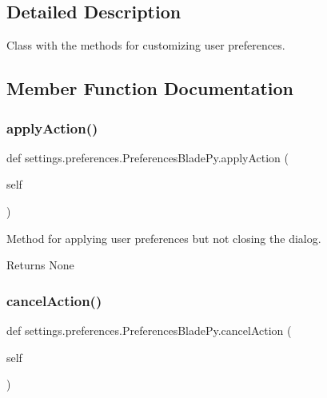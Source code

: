 \subsection{Detailed Description}
Class with the methods for customizing user preferences. 

\subsection{Member Function Documentation}
\hypertarget{a00109_a8938a7b43ca7c5496a0ae7bf8d6a0c54}{}\label{a00109_a8938a7b43ca7c5496a0ae7bf8d6a0c54} 
\subsubsection{\texorpdfstring{apply\+Action()}{applyAction()}}
{\footnotesize\ttfamily def settings.\+preferences.\+Preferences\+Blade\+Py.\+apply\+Action (\begin{DoxyParamCaption}\item[{}]{self }\end{DoxyParamCaption})}



Method for applying user preferences but not closing the dialog. 

\begin{DoxyReturn}{Returns}
None 
\end{DoxyReturn}
\hypertarget{a00109_af92de31fcc110a9892dc2914efb6b46f}{}\label{a00109_af92de31fcc110a9892dc2914efb6b46f} 
\subsubsection{\texorpdfstring{cancel\+Action()}{cancelAction()}}
{\footnotesize\ttfamily def settings.\+preferences.\+Preferences\+Blade\+Py.\+cancel\+Action (\begin{DoxyParamCaption}\item[{}]{self }\end{DoxyParamCaption})}



